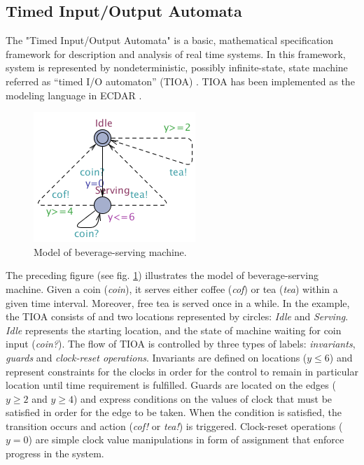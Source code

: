 


\subsection{Timed Input/Output Automata \label{background-tioa}}
%
The "Timed Input/Output Automata" is a basic, mathematical specification framework for description and analysis of real time systems. 
In this framework, system is represented by nondeterministic, possibly infinite-state, state machine referred 
as “timed I/O automaton” (TIOA) \cite{Kaynar:2006:TTI:1203437}. TIOA has been implemented as the modeling language in ECDAR \cite{conf/atva/DavidLLNW10}.

\begin{figure}[t]
\label{simple-model}
\begin{centering}
\includegraphics[scale=0.7]{images/bev_machine_model}
\par\end{centering}
\caption{Model of beverage-serving machine.}
\label{bev-machine}
\end{figure}

The preceding figure (see fig. \ref{bev-machine}) illustrates the model of beverage-serving machine. Given a coin (\emph{coin}), it serves either coffee (\emph{cof}) 
or tea (\emph{tea}) within a given time interval. Moreover, free tea is served once in a while. In the example, the TIOA consists of and two locations represented by 
circles: \emph{Idle} and \emph{Serving}. \emph{Idle} represents the starting location, and the state of machine waiting for coin input (\emph{coin?}).  
 The flow of TIOA is controlled by three types of labels: \emph{invariants}, \emph{guards} and \emph{clock-reset operations}. 
Invariants are defined on locations ($y\leq 6$) and represent constraints for the clocks in order for the control to remain in particular location until time requirement is fulfilled.  
Guards are located on the edges ($y\geq 2$ and $y\geq 4$) and express conditions on the values of clock that must be satisfied in order for 
the edge to be taken. When the condition is satisfied, the transition occurs and action (\emph{cof!} or \emph{tea!}) is triggered. Clock-reset operations ($y=0$) are simple
clock value manipulations in form of assignment that enforce progress in the system.

